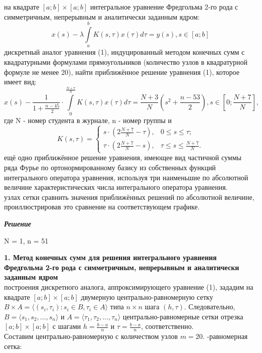 \documentclass[12pt]{article}
\begin{document}
 на квадрате 
$[a;b]\times[a;b]$
интегральное уравнение Фредгольма 2-го рода с 
симметричным, непрерывным и аналитически заданным ядром:
\begin{equation}
    x(s)-\lambda\int\limits_a^b K(s,\tau)x(\tau)d\tau=y(s),s\in[a;b]
\end{equation}
 дискретный аналог уравнения (1), индуцированный методом конечных сумм с 
квадратурными формулами прямоугольников (количество узлов в квадратурной формуле 
не менее 20), найти приближённое решение уравнения (1), которое имеет вид:
$$x(s)-\frac{1}{1+\frac{n-45}{2}}\cdot\int\limits_0^{\frac{N+7}{N}} K(s,\tau)x(\tau)d\tau=\frac{N+3}{N}(s^2+\frac{n-53}{2}),s\in[0;\frac{N+7}{N}],$$
где N - номер студента в журнале, n - номер группы и
\begin{equation*}
K(s,\tau) = 
 \begin{cases}
   s\cdot(2\frac{N+7}{N}-\tau), &\text{$0\leq s\leq \tau$;}\\
   \tau\cdot(2\frac{N+7}{N}-s), &\text{$\tau \leq s\leq \frac{N+7}{N}$.}
 \end{cases}
\end{equation*}
 ещё одно приближённое решение уравнения, имеющее вид частичной суммы ряда Фурье по ортонормированному базису из собственных функций интегрального оператора уравнения, используя три наименьшие по абсолютной величине характеристических числа интегрального оператора уравнения.\\
 узлах сетки сравнить значения приближённых решений по абсолютной величине,  проиллюстрировав это сравнение на соответствующем графике.
\begin{center}
	\textbf{\textit{Решение}}
\end{center}
N = 1, n = 51

\textbf{1. Метод конечных сумм для решения интегрального уравнения Фредгольма 2-го рода с симметричным, непрерывным и аналитически заданным ядром}\\
 построения дискретного аналога, аппроксимирующего уравнение (1), зададим на квадрате $[a;b]\times[a;b]$ двумерную центрально-равномерную сетку $B\times A=\langle(s_i,\tau_i):s_i\in B,\tau_i\in A\rangle$
типа $n\times n$ шага $(h,\tau)$. Следовательно, $B=\langle s_1,s_2,...,s_n\rangle$ и $A=\langle \tau_1,\tau_2,...,\tau_n\rangle$ центрально-равномерные сетки отрезка $[a;b]\times[a;b]$ с шагами $h=\frac{b-a}{n}$ и $\tau=\frac{b-a}{n}$, соответственно.\\

Составим центрально-равномерную с количеством узлов $m=20$.
\newpage
{}-равномерная сетка:
\end{document}
